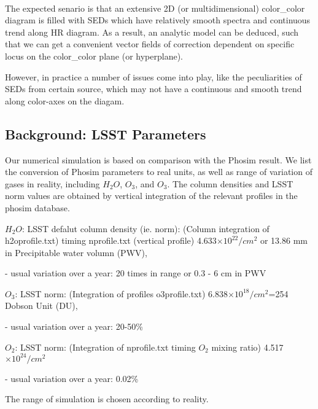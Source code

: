 \documentclass[a4paper,12pt]{article}
\begin{document}
\paragraph{}
\paragraph{}


The expected senario is that an extensive 2D (or multidimensional) color\_color diagram is filled with SEDs which have relatively smooth spectra and continuous trend along HR diagram. As a result, an analytic model can be deduced, such that we can get a convenient vector fields of correction dependent on specific locus on the color\_color plane (or hyperplane). 

However, in practice a number of issues come into play, like the peculiarities of SEDs from certain source, which may not have a continuous and smooth trend along color-axes on the diagam.



\subsection{Background: LSST Parameters}

Our numerical simulation is based on comparison with the Phosim result. We list the conversion of Phosim parameters to real units, as well as range of variation of gases in reality, including $H_{2}O$, $O_{3}$, and $O_{3}$. The column densities and LSST norm values are obtained by vertical integration of the relevant profiles in the phosim database.

\rm{$H_2O$}: LSST defalut column density (ie. norm): (Column integration of h2oprofile.txt) timing nprofile.txt (vertical profile) 4.633$\times10^{22}/cm^2$ or 13.86 mm in Precipitable water volumn (PWV), 

\rm{- usual variation over a year: 20 times in range or 0.3 - 6 cm in PWV}

\rm{$O_3$}: LSST norm: (Integration of profiles o3profile.txt) 6.838$\times10^{18}/cm^2$=254 Dobson Unit (DU),

\rm{- usual variation over a year: 20-50\%}

\rm{$O_2$}: LSST norm: (Integration of nprofile.txt timing $O_2$ mixing ratio) 4.517$\times10^{24}/cm^2$

\rm{- usual variation over a year: 0.02\%} \cite{atmoswater}

The range of simulation is chosen according to reality.
\end{document}
